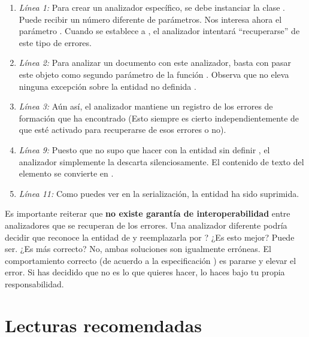 \begin{enumerate}

\item \emph{Línea 1:} Para crear un analizador específico, se debe instanciar la clase . Puede recibir un número diferente de parámetros. Nos interesa ahora el parámetro . Cuando se establece a , el analizador  intentará ``recuperarse'' de este tipo de errores.

\item \emph{Línea 2:} Para analizar un documento  con este analizador, basta con pasar este objeto  como segundo parámetro de la función . Observa que  no eleva ninguna excepción sobre la entidad no definida .

\item \emph{Línea 3:} Aún así, el analizador mantiene un registro de los errores de formación que ha encontrado (Esto siempre es cierto independientemente de que esté activado para recuperarse de esos errores o no).

\item \emph{Línea 9:} Puesto que no supo que hacer con la entidad sin definir , el analizador simplemente la descarta silenciosamente. El contenido de texto del elemento  se convierte en .

\item \emph{Línea 11:} Como puedes ver en la serialización, la entidad  ha sido suprimida.

\end{enumerate}

Es importante reiterar que \textbf{no existe garantía de interoperabilidad} entre analizadores  que se recuperan de los errores. Una analizador diferente podría decidir que reconoce la entidad  de  y reemplazarla por ? ¿Es esto mejor? Puede ser. ¿Es más correcto? No, ambas soluciones son igualmente erróneas. El comportamiento correcto (de acuerdo a la especificación ) es pararse y elevar el error. Si has decidido que no es lo que quieres hacer, lo haces bajo tu propia responsabilidad.

\section{Lecturas recomendadas}

